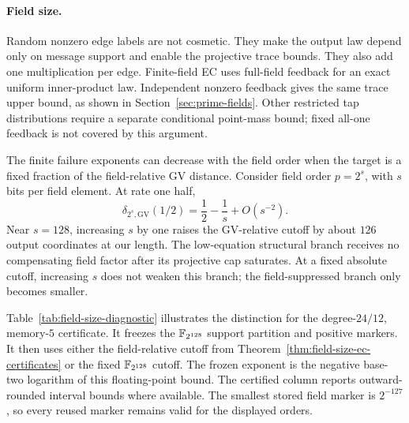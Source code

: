 \paragraph{Field size.}
Random nonzero edge labels are not cosmetic.  They make the output law depend
only on message support and enable the projective trace bounds.  They also add
one multiplication per edge.  Finite-field EC uses full-field feedback for
an exact uniform inner-product law.  Independent nonzero feedback gives the
same trace upper bound, as shown in Section~\ref{sec:prime-fields}.
Other restricted tap distributions require a separate conditional
point-mass bound; fixed all-one feedback is not covered by this argument.

The finite failure exponents can decrease with the field order when the target
is a fixed fraction of the field-relative GV distance.  Consider field order
$p=2^s$, with $s$ bits per field element.  At rate one half,
\[
 \delta_{2^s,\mathrm{GV}}(1/2)=\frac12-\frac1s+O(s^{-2}).
\]
Near $s=128$, increasing $s$ by one raises the GV-relative cutoff by about
$126$ output coordinates at our length.  The low-equation
structural branch receives no compensating field factor after its projective
cap saturates.  At a fixed absolute cutoff, increasing $s$ does not weaken
this branch; the field-suppressed branch only becomes smaller.

Table~\ref{tab:field-size-diagnostic} illustrates the distinction for the
degree-$24/12$, memory-$5$ certificate.  It freezes the $\mathbb F_{2^{128}}$ support
partition and positive markers.  It then uses either the field-relative
cutoff from Theorem~\ref{thm:field-size-ec-certificates} or the fixed
$\mathbb F_{2^{128}}$ cutoff.  The frozen exponent is the negative base-two
logarithm of this floating-point bound.  The certified column reports
outward-rounded interval bounds where available.  The smallest stored field
marker is $2^{-127}$, so every reused marker remains valid for the displayed
orders.

